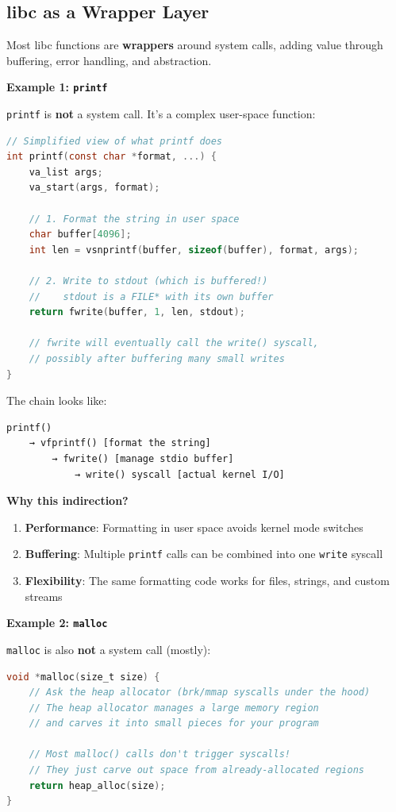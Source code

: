 \subsection{libc as a Wrapper Layer}

Most libc functions are \textbf{wrappers} around system calls, adding value through buffering, error handling, and abstraction.

\textbf{Example 1: \texttt{printf}}

\texttt{printf} is \textbf{not} a system call. It's a complex user-space function:

\begin{lstlisting}[language=C]
// Simplified view of what printf does
int printf(const char *format, ...) {
    va_list args;
    va_start(args, format);

    // 1. Format the string in user space
    char buffer[4096];
    int len = vsnprintf(buffer, sizeof(buffer), format, args);

    // 2. Write to stdout (which is buffered!)
    //    stdout is a FILE* with its own buffer
    return fwrite(buffer, 1, len, stdout);

    // fwrite will eventually call the write() syscall,
    // possibly after buffering many small writes
}
\end{lstlisting}

The chain looks like:
\begin{verbatim}
printf()
    → vfprintf() [format the string]
        → fwrite() [manage stdio buffer]
            → write() syscall [actual kernel I/O]
\end{verbatim}

\textbf{Why this indirection?}
\begin{enumerate}
    \item \textbf{Performance}: Formatting in user space avoids kernel mode switches
    \item \textbf{Buffering}: Multiple \texttt{printf} calls can be combined into one \texttt{write} syscall
    \item \textbf{Flexibility}: The same formatting code works for files, strings, and custom streams
\end{enumerate}

\textbf{Example 2: \texttt{malloc}}

\texttt{malloc} is also \textbf{not} a system call (mostly):

\begin{lstlisting}[language=C]
void *malloc(size_t size) {
    // Ask the heap allocator (brk/mmap syscalls under the hood)
    // The heap allocator manages a large memory region
    // and carves it into small pieces for your program

    // Most malloc() calls don't trigger syscalls!
    // They just carve out space from already-allocated regions
    return heap_alloc(size);
}
\end{lstlisting}

